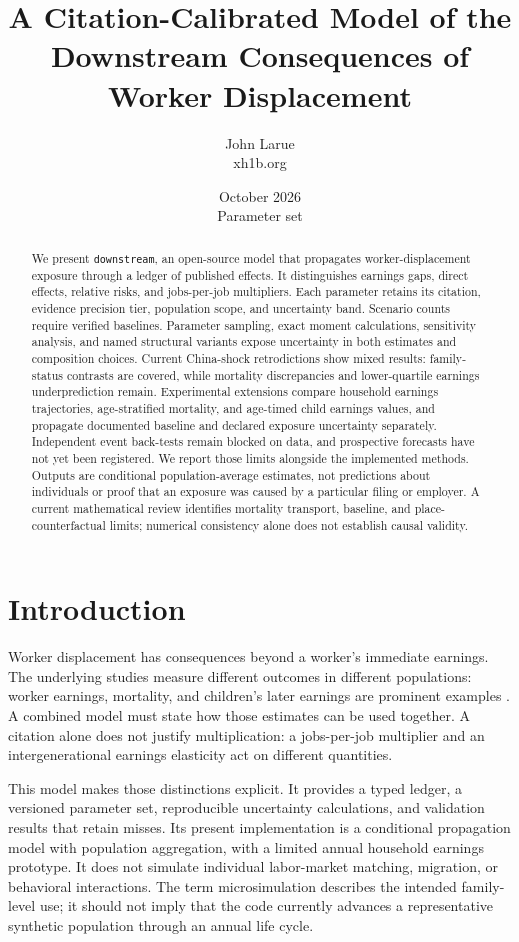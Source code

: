 \documentclass[10pt]{article}
\title{A Citation-Calibrated Model of the\\Downstream Consequences of Worker Displacement}
\author{John Larue\\\small xh1b.org}
\date{October 2026\\\small Parameter set \ParameterVersion}
\begin{document}
\maketitle
\begin{abstract}
We present \texttt{downstream}, an open-source model that propagates
worker-displacement exposure through a ledger of published effects.
It distinguishes earnings gaps, direct effects, relative risks, and
jobs-per-job multipliers. Each parameter retains its citation, evidence
precision tier, population scope, and uncertainty band. Scenario counts
require verified baselines. Parameter sampling, exact moment calculations,
sensitivity analysis, and named structural variants expose uncertainty
in both estimates and composition choices. Current China-shock
retrodictions show mixed results: family-status contrasts are covered,
while mortality discrepancies and lower-quartile earnings underprediction
remain. Experimental extensions compare household earnings trajectories,
age-stratified mortality, and age-timed child earnings values, and propagate
documented baseline and declared exposure uncertainty separately.
Independent event back-tests remain blocked on data, and prospective
forecasts have not yet been registered. We report those limits alongside
the implemented methods. Outputs are conditional population-average
estimates, not predictions about individuals or proof that an exposure
was caused by a particular filing or employer. A current mathematical
review identifies mortality transport, baseline, and place-counterfactual
limits; numerical consistency alone does not
establish causal validity.
\end{abstract}

\section{Introduction}
Worker displacement has consequences beyond a worker's immediate earnings.
The underlying studies measure different outcomes in different populations:
worker earnings, mortality, and children's later earnings are prominent
examples \cite{jacobson1993,sullivan2009,oreopoulos2008}.
A combined model must state how those estimates can be used together.
A citation alone does not justify multiplication: a jobs-per-job multiplier
and an intergenerational earnings elasticity act on different quantities.

This model makes those distinctions explicit. It provides a typed ledger,
a versioned parameter set, reproducible uncertainty calculations, and
validation results that retain misses. Its present implementation is a
conditional propagation model with population aggregation, with a limited
annual household earnings prototype. It does not
simulate individual labor-market matching, migration, or behavioral
interactions. The term microsimulation describes the intended family-level
use; it should not imply that the code currently advances a representative
synthetic population through an annual life cycle.
\end{document}
